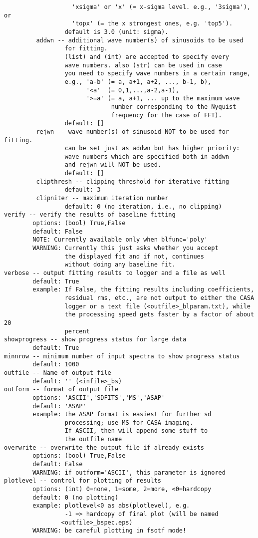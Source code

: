 \begin{verbatim}
                   'xsigma' or 'x' (= x-sigma level. e.g., '3sigma'), or
                   'topx' (= the x strongest ones, e.g. 'top5').
                 default is 3.0 (unit: sigma).
         addwn -- additional wave number(s) of sinusoids to be used 
                 for fitting. 
                 (list) and (int) are accepted to specify every
                 wave numbers. also (str) can be used in case
                 you need to specify wave numbers in a certain range,
                 e.g., 'a-b' (= a, a+1, a+2, ..., b-1, b),
                       '<a'  (= 0,1,...,a-2,a-1),
                       '>=a' (= a, a+1, ... up to the maximum wave
                              number corresponding to the Nyquist
                              frequency for the case of FFT).
                 default: []
         rejwn -- wave number(s) of sinusoid NOT to be used for fitting.
                 can be set just as addwn but has higher priority:
                 wave numbers which are specified both in addwn
                 and rejwn will NOT be used. 
                 default: []
         clipthresh -- clipping threshold for iterative fitting
                 default: 3
         clipniter -- maximum iteration number
                 default: 0 (no iteration, i.e., no clipping)
verify -- verify the results of baseline fitting
        options: (bool) True,False
        default: False
        NOTE: Currently available only when blfunc='poly'
        WARNING: Currently this just asks whether you accept
                 the displayed fit and if not, continues
                 without doing any baseline fit.
verbose -- output fitting results to logger and a file as well
        default: True
        example: If False, the fitting results including coefficients, 
                 residual rms, etc., are not output to either the CASA 
                 logger or a text file (<outfile>_blparam.txt), while 
                 the processing speed gets faster by a factor of about 20 
                 percent
showprogress -- show progress status for large data
        default: True
minnrow -- minimum number of input spectra to show progress status
        default: 1000
outfile -- Name of output file
        default: '' (<infile>_bs)
outform -- format of output file
        options: 'ASCII','SDFITS','MS','ASAP'
        default: 'ASAP'
        example: the ASAP format is easiest for further sd
                 processing; use MS for CASA imaging.
                 If ASCII, then will append some stuff to
                 the outfile name
overwrite -- overwrite the output file if already exists
        options: (bool) True,False
        default: False
        WARNING: if outform='ASCII', this parameter is ignored
plotlevel -- control for plotting of results
        options: (int) 0=none, 1=some, 2=more, <0=hardcopy
        default: 0 (no plotting)
        example: plotlevel<0 as abs(plotlevel), e.g.
                 -1 => hardcopy of final plot (will be named
                <outfile>_bspec.eps)
        WARNING: be careful plotting in fsotf mode!

\end{verbatim}

